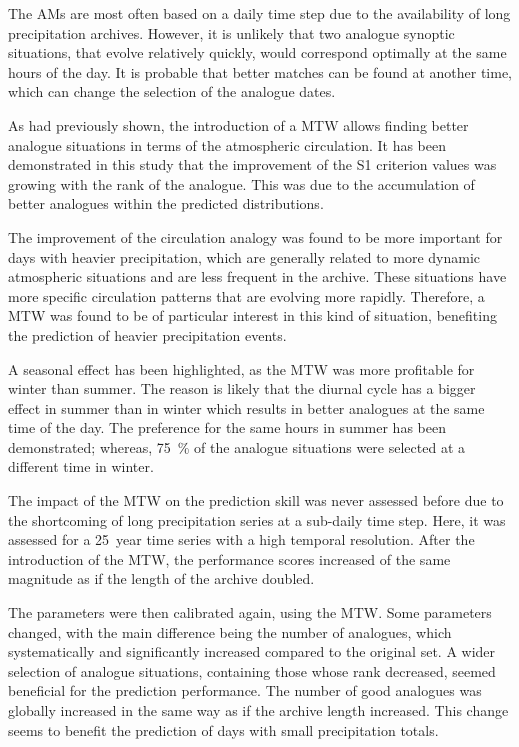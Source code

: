 \documentclass[hess, manuscript]{copernicus}
\begin{document}
	
	
	\conclusions  %
	\label{sec:conclusions}
	
	The AMs are most often based on a daily time step due to the availability of long precipitation archives. However, it is unlikely that two analogue synoptic situations, that evolve relatively quickly, would correspond optimally at the same hours of the day. It is probable that better matches can be found at another time, which can change the selection of the analogue dates.
	
	As \citet{Finet2008} had previously shown, the introduction of a MTW allows finding better analogue situations in terms of the atmospheric circulation. It has been demonstrated in this study that the improvement of the S1 criterion values was growing with the rank of the analogue. This was due to the accumulation of better analogues within the predicted distributions.
	
	The improvement of the circulation analogy was found to be more important for days with heavier precipitation, which are generally related to more dynamic atmospheric situations and are less frequent in the archive. These situations have more specific circulation patterns that are evolving more rapidly. Therefore, a MTW was found to be of particular interest in this kind of situation, benefiting the prediction of heavier precipitation events.
	
	A seasonal effect has been highlighted, as the MTW was more profitable for winter than summer. The reason is likely that the diurnal cycle has a bigger effect in summer than in winter which results in better analogues at the same time of the day. The preference for the same hours in summer has been demonstrated; whereas, 75~\% of the analogue situations were selected at a different time in winter.
	
	The impact of the MTW on the prediction skill was never assessed before due to the shortcoming of long precipitation series at a sub-daily time step. Here, it was assessed for a 25~year time series with a high temporal resolution. After the introduction of the MTW, the performance scores increased of the same magnitude as if the length of the archive doubled.
	
	The parameters were then calibrated again, using the MTW. Some parameters changed, with the main difference being the number of analogues, which systematically and significantly increased compared to the original set. A wider selection of analogue situations, containing those whose rank decreased, seemed beneficial for the prediction performance. The number of good analogues was globally increased in the same way as if the archive length increased. This change seems to benefit the prediction of days with small precipitation totals.
	
\end{document}
